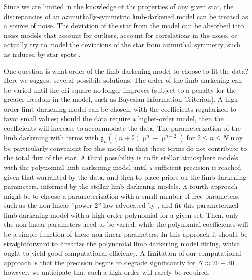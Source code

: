 \documentclass[modern,trackchanges]{aastex63}
\begin{document}
Since we are limited in the knowledge of the properties of any given star,
the discrepancies of an azimuthally-symmetric limb-darkened model can be
treated as a source of noise.
The deviation of the star from the model can be absorbed into noise models that
account for outliers, account for correlations in the noise, or actually
try to model the deviations of the star from azimuthal symmetry, such as
induced by star spots \citep[e.g.][]{SanchisOjeda2011}.


One question is what order of the limb darkening model to choose to
fit the data?  Here we suggest several possibile solutions.  The order of the
limb darkening can be varied until the chi-square no longer improves (subject
to a penalty for the greater freedom in the model, such as Bayesian Information
Criterion).  A high-order limb darkening model can be chosen, with the
coefficients regularized to favor small values;  should the data require
a higher-order model, then the coefficients will increase to accommodate
the data.  The parameterization of the limb darkening with terms with
$\mathfrak{g}_n ((n+2)\upmu^n-\upmu^{n-2})$ for $2 \le n \le N$ may be particularly
convenient for this model in that these terms do not contribute to the
total flux of the star.  A third possibility is to fit stellar atmosphere
models with the polynomial limb darkening model until a sufficient precision
is reached given that warranted by the data, and then to place priors
on the limb darkening parameters, informed by the stellar limb darkening
models.  A fourth approach might be to choose a parameterization with
a small number of free parameters, such as the non-linear ``power-2'' law advocated
by \citet{Maxted2018}, and fit this parameterized limb darkening model
with a high-order polynomial for a given set.  Then, only the non-linear
parameters need to be varied, while the polynomial coefficients will
be a simple function of these non-linear parameters.  In this approach
it should be straightforward to linearize the polynomial limb darkening
model fitting, which ought to yield good computational efficiency.
A limitation of our computational approach is that the precision
begins to degrade significantly for $N \approx 25-30$; however, we anticipate that such
a high order will rarely be required.
\end{document}
